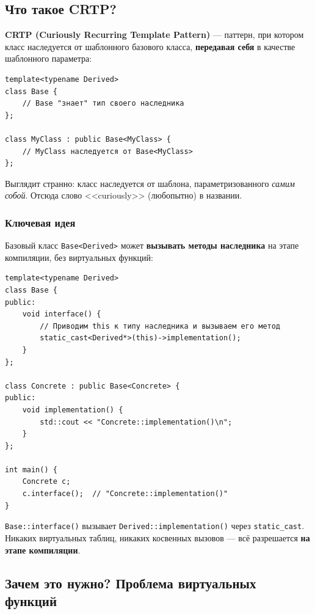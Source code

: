 \documentclass[a4paper,12pt]{article}
\begin{document}
\subsection{Что такое CRTP?}

\textbf{CRTP (Curiously Recurring Template Pattern)} --- паттерн, при котором
класс наследуется от шаблонного базового класса, \textbf{передавая себя}
в качестве шаблонного параметра:

\begin{lstlisting}
template<typename Derived>
class Base {
    // Base "знает" тип своего наследника
};

class MyClass : public Base<MyClass> {
    // MyClass наследуется от Base<MyClass>
};
\end{lstlisting}

Выглядит странно: класс наследуется от шаблона, параметризованного
\textit{самим собой}. Отсюда слово <<curiously>> (любопытно) в названии.

\subsubsection{Ключевая идея}

Базовый класс \texttt{Base<Derived>} может \textbf{вызывать методы наследника}
на этапе компиляции, без виртуальных функций:

\begin{lstlisting}
template<typename Derived>
class Base {
public:
    void interface() {
        // Приводим this к типу наследника и вызываем его метод
        static_cast<Derived*>(this)->implementation();
    }
};

class Concrete : public Base<Concrete> {
public:
    void implementation() {
        std::cout << "Concrete::implementation()\n";
    }
};

int main() {
    Concrete c;
    c.interface();  // "Concrete::implementation()"
}
\end{lstlisting}

\texttt{Base::interface()} вызывает \texttt{Derived::implementation()} через
\texttt{static\_cast}. Никаких виртуальных таблиц, никаких косвенных вызовов ---
всё разрешается \textbf{на этапе компиляции}.

\subsection{Зачем это нужно? Проблема виртуальных функций}
\end{document}
